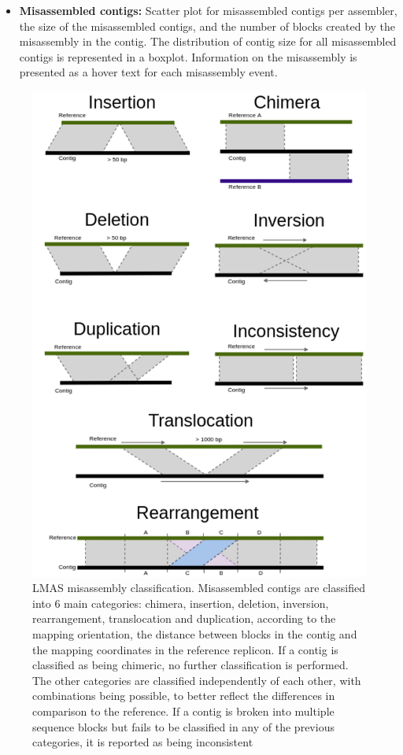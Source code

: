 \begin{itemize}
    \item \textbf{Misassembled contigs:} Scatter plot for misassembled contigs per assembler, the size of the misassembled contigs, and the number of blocks created by the misassembly in the contig.  The distribution of contig size for all misassembled contigs is represented in a boxplot. Information on the misassembly is presented as a hover text for each misassembly event.
\end{itemize} 

\begin{figure}[]
\centering
\includegraphics[scale=0.95]{figures/chapter 5/Supplemental Figure 1.png}
\caption{LMAS misassembly classification. Misassembled contigs are classified into 6 main categories: chimera, insertion, deletion, inversion, rearrangement, translocation and duplication, according to the mapping orientation, the distance between blocks in the contig and the mapping coordinates in the reference replicon. If a contig is classified as being chimeric, no further classification is performed. The other categories are classified independently of each other, with combinations being possible, to better reflect the differences in comparison to the reference. If a contig is broken into multiple sequence blocks but fails to be classified in any of the previous categories, it is reported as being inconsistent}
\label{fig:chap5_sup_figure_1}
\end{figure}

